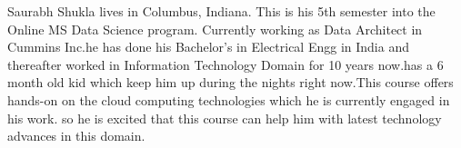 Saurabh Shukla lives in Columbus, Indiana. This is his 5th semester into the Online MS Data Science program. Currently working as Data Architect in Cummins Inc.he has done his Bachelor's in Electrical Engg in India and thereafter worked in Information Technology Domain for 10 years now.has a 6 month old kid which keep him up during the nights right now.This course offers hands-on on the cloud computing technologies which he is currently engaged in his work. so he is excited that this course can help him with latest technology advances in this domain.
